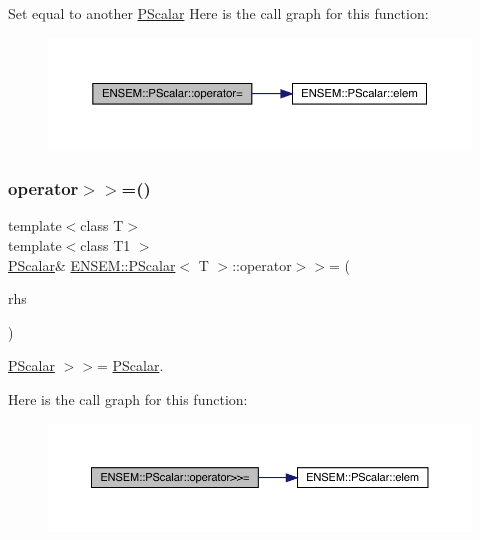 Set equal to another \mbox{\hyperlink{classENSEM_1_1PScalar}{P\+Scalar}} Here is the call graph for this function\+:
\nopagebreak
\begin{figure}[H]
\begin{center}
\leavevmode
\includegraphics[width=350pt]{d3/d27/classENSEM_1_1PScalar_ae69d6f1ad8ec0b65652f8d16c5f97b11_cgraph}
\end{center}
\end{figure}
\mbox{\label{classENSEM_1_1PScalar_a8fe07cd0462ddff9e3d0858ebe29e77c}} 
\subsubsection{\texorpdfstring{operator$>$$>$=()}{operator>>=()}\hspace{0.1cm}{\footnotesize\ttfamily [1/2]}}
{\footnotesize\ttfamily template$<$class T$>$ \\
template$<$class T1 $>$ \\
\mbox{\hyperlink{classENSEM_1_1PScalar}{P\+Scalar}}\& \mbox{\hyperlink{classENSEM_1_1PScalar}{E\+N\+S\+E\+M\+::\+P\+Scalar}}$<$ T $>$\+::operator$>$$>$= (\begin{DoxyParamCaption}\item[{const \mbox{\hyperlink{classENSEM_1_1PScalar}{P\+Scalar}}$<$ T1 $>$ \&}]{rhs }\end{DoxyParamCaption})\hspace{0.3cm}{\ttfamily [inline]}}



\mbox{\hyperlink{classENSEM_1_1PScalar}{P\+Scalar}} $>$$>$= \mbox{\hyperlink{classENSEM_1_1PScalar}{P\+Scalar}}. 

Here is the call graph for this function\+:
\nopagebreak
\begin{figure}[H]
\begin{center}
\leavevmode
\includegraphics[width=350pt]{d3/d27/classENSEM_1_1PScalar_a8fe07cd0462ddff9e3d0858ebe29e77c_cgraph}
\end{center}
\end{figure}
\mbox{\label{classENSEM_1_1PScalar_a8fe07cd0462ddff9e3d0858ebe29e77c}} 
